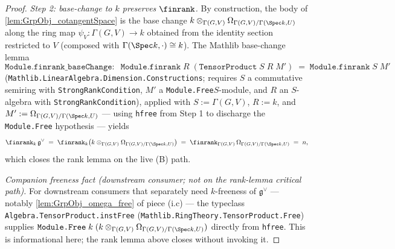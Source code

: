 \begin{proof}
  \emph{Step 2: base-change to \(k\) preserves \(\finrank\).} By construction, the body of \cref{lem:GrpObj_cotangentSpace} is the base change \(k \otimes_{\Gamma(G, V)} \Omega_{\Gamma(G, V)/\Gamma(\Spec k, U)}\) along the ring map \(\psi_V \colon \Gamma(G, V) \to k\) obtained from the identity section restricted to \(V\) (composed with \(\Gamma(\Spec k, \cdot) \cong k\)). The Mathlib base-change lemma
  \[
    \texttt{Module.finrank\_baseChange} \colon\;\;
    \texttt{Module.finrank}\;R\;(\texttt{TensorProduct}\;S\;R\;M')
      \;=\; \texttt{Module.finrank}\;S\;M'
  \]
  (\texttt{Mathlib.LinearAlgebra.Dimension.Constructions}; requires \(S\) a commutative semiring with \texttt{StrongRankCondition}, \(M'\) a \texttt{Module.Free}\;\(S\)-module, and \(R\) an \(S\)-algebra with \texttt{StrongRankCondition}), applied with \(S := \Gamma(G, V)\), \(R := k\), and \(M' := \Omega_{\Gamma(G, V)/\Gamma(\Spec k, U)}\) — using \texttt{hfree} from Step 1 to discharge the \texttt{Module.Free} hypothesis — yields
  \[
    \finrank_{k}\,\mathfrak g^{\vee} \;=\; \finrank_{k}\bigl(k \otimes_{\Gamma(G, V)} \Omega_{\Gamma(G, V)/\Gamma(\Spec k, U)}\bigr) \;=\; \finrank_{\Gamma(G, V)}\,\Omega_{\Gamma(G, V)/\Gamma(\Spec k, U)} \;=\; n,
  \]
  which closes the rank lemma on the live (B) path.

  \emph{Companion freeness fact (downstream consumer; not on the rank-lemma critical path).} For downstream consumers that separately need \(k\)-freeness of \(\mathfrak g^{\vee}\) — notably \cref{lem:GrpObj_omega_free} of piece (i.c) — the typeclass \texttt{Algebra.TensorProduct.instFree} (\texttt{Mathlib.RingTheory.TensorProduct.Free}) supplies \(\texttt{Module.Free}\;k\;(k \otimes_{\Gamma(G, V)} \Omega_{\Gamma(G, V)/\Gamma(\Spec k, U)})\) directly from \texttt{hfree}. This is informational here; the rank lemma above closes without invoking it.


\end{proof}
